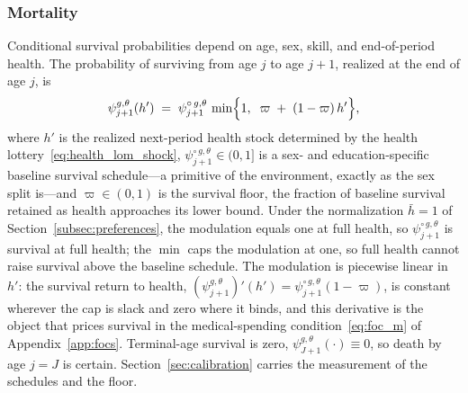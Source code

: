 \documentclass[12pt,a4paper]{article}
\begin{document}
\subsubsection{Mortality}
\label{subsubsec:mortality}

Conditional survival probabilities depend on age, sex, skill, and end-of-period health. The probability of surviving from age $j$ to age $j+1$, realized at the end of age $j$, is
\begin{equation}
\label{eq:survival_modulation}
\psi_{j+1}^{g,\theta}(h')
\;=\;
\psi^{\circ\, g,\theta}_{j+1}\,
\min\Bigl\{1,\;\; \varpi \;+\; (1-\varpi)\, h'\Bigr\},
\end{equation}
where $h'$ is the realized next-period health stock determined by the health lottery~\eqref{eq:health_lom_shock}, $\psi^{\circ\, g,\theta}_{j+1} \in (0,1]$ is a sex- and education-specific baseline survival schedule---a primitive of the environment, exactly as the sex split is---and $\varpi \in (0,1)$ is the survival floor, the fraction of baseline survival retained as health approaches its lower bound. Under the normalization $\bar h = 1$ of Section~\ref{subsec:preferences}, the modulation equals one at full health, so $\psi^{\circ\, g,\theta}_{j+1}$ is survival at full health; the $\min$ caps the modulation at one, so full health cannot raise survival above the baseline schedule. The modulation is piecewise linear in $h'$: the survival return to health, $(\psi^{g,\theta}_{j+1})'(h') = \psi^{\circ\, g,\theta}_{j+1}(1-\varpi)$, is constant wherever the cap is slack and zero where it binds, and this derivative is the object that prices survival in the medical-spending condition~\eqref{eq:foc_m} of Appendix~\ref{app:focs}. Terminal-age survival is zero, $\psi_{J+1}^{g,\theta}(\cdot) \equiv 0$, so death by age $j = J$ is certain. Section~\ref{sec:calibration} carries the measurement of the schedules and the floor.
\end{document}

